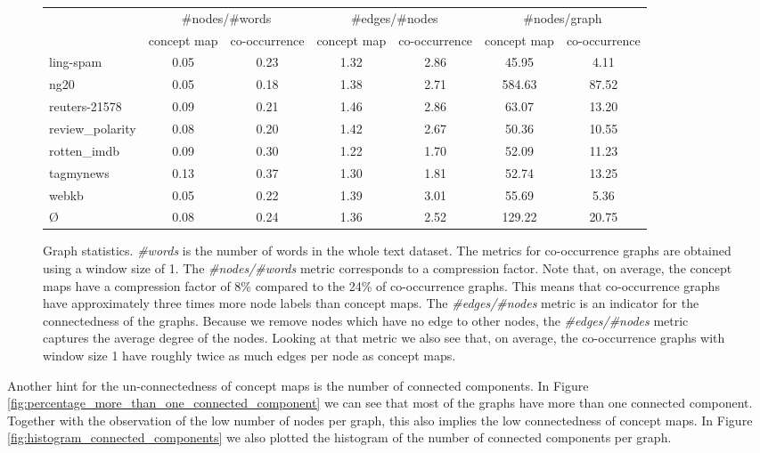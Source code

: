 \begin{figure}[ht]
	\centering
	\begin{tabular}{lcccccc}
		{} &  \multicolumn{2}{c}{\#nodes/\#words} &  \multicolumn{2}{c}{\#edges/\#nodes} & \multicolumn{2}{c}{\#nodes/graph} \\
		{} & concept map &  co-occurrence & concept map & co-occurrence & concept map & co-occurrence\\
		\midrule
		ling-spam       & 0.05 & 0.23 & 1.32 & 2.86 & 45.95 & 4.11 \\
		ng20            & 0.05 & 0.18 & 1.38 & 2.71 & 584.63 & 87.52 \\
		reuters-21578   & 0.09 & 0.21 & 1.46 & 2.86 & 63.07 & 13.20 \\
		review\_polarity & 0.08 & 0.20 & 1.42 & 2.67 & 50.36 & 10.55 \\
		rotten\_imdb     & 0.09 & 0.30 & 1.22 & 1.70 & 52.09 & 11.23 \\
		tagmynews       & 0.13 & 0.37 & 1.30 & 1.81 & 52.74 & 13.25 \\
		webkb           & 0.05 & 0.22 & 1.39 & 3.01 & 55.69 & 5.36 \\
		\midrule
		\O{}            & 0.08 & 0.24 & 1.36 & 2.52 & 129.22 & 20.75 \\
		\bottomrule
	\end{tabular}
	\caption{Graph statistics. \textit{\#words} is the number of words in the whole text dataset. The metrics for co-occurrence graphs are obtained using a window size of 1. The \textit{\#nodes/\#words} metric corresponds to a compression factor. Note that, on average, the concept maps have a compression factor of 8\% compared to the 24\% of co-occurrence graphs. This means that co-occurrence graphs have approximately three times more node labels than concept maps. The \textit{\#edges/\#nodes} metric is an indicator for the connectedness of the graphs. Because we remove nodes which have no edge to other nodes, the \textit{\#edges/\#nodes} metric captures the average degree of the nodes. Looking at that metric we also see that, on average, the co-occurrence graphs with window size 1 have roughly twice as much edges per node as concept maps.}\label{fig:graph_statistics}
\end{figure}


Another hint for the un-connectedness of concept maps is the number of connected components.
In Figure \ref{fig:percentage_more_than_one_connected_component} we can see that most of the graphs have more than one connected component. Together with the observation of the low number of nodes per graph, this also implies the low connectedness of concept maps.
In Figure \ref{fig:histogram_connected_components} we also plotted the histogram of the number of connected components per graph.

